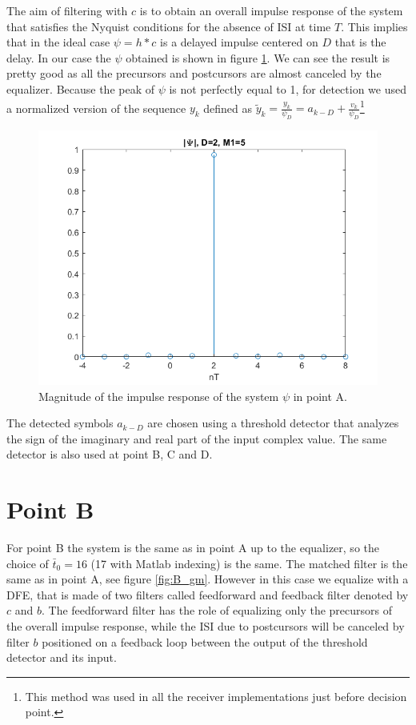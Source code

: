 \documentclass[a4paper,11.5pt]{article}
\begin{document}
The aim of filtering with $c$ is to obtain an overall impulse response of the system that satisfies the Nyquist conditions for the absence of ISI at time $T$. This implies that in the ideal case $\psi=h*c$ is a delayed impulse centered on $D$ that is the delay. In our case the $\psi$ obtained is shown in figure \ref{fig:A_psi}. We can see the result is pretty good as all the precursors and postcursors are almost canceled by the equalizer. Because the peak of $\psi$ is not perfectly equal to 1, for detection we used a normalized version of the sequence $y_k$ defined as $\tilde{y}_k=\frac{y_k}{\psi_D}=a_{k-D} + \frac{v_k}{\psi_D}$\footnote{This method was used in all the receiver implementations just before decision point.}


\begin{figure}[H]
	\begin{center}   
		\includegraphics[width=\textwidth]{figs/A_psi.png} 
		\caption{Magnitude of the impulse response of the system $\psi$ in point A.}
		\label{fig:A_psi}
	\end{center}
\end{figure}

The detected symbols $a_{k-D}$ are chosen using a threshold detector that analyzes the sign of the imaginary and real part of the input complex value. The same detector is also used at point B, C and D.


\section*{Point B}

For point B the system is the same as in point A up to the equalizer, so the choice of $\bar{t}_0=16$ (17 with Matlab indexing) is the same. The matched filter is the same as in point A, see figure \ref{fig:B_gm}. However in this case we equalize with a DFE, that is made of two filters called feedforward and feedback filter denoted by $c$ and $b$. The feedforward filter has the role of equalizing only the precursors of the overall impulse response, while the ISI due to postcursors will be canceled by filter $b$ positioned on a feedback loop between the output of the threshold detector and its input. 
\end{document}
